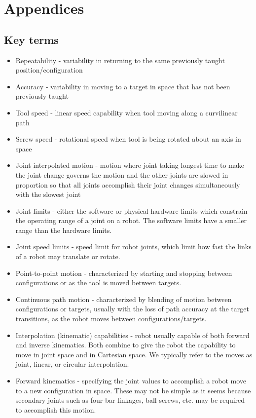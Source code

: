 \documentclass{book}
\begin{document}
\chapter{Appendices}

\section{Key terms}
	\begin{itemize}
		\item 	Repeatability - variability in returning to the same previously taught position/configuration
		\item Accuracy - variability in moving to a target in space that has not been previously taught
		\item Tool speed - linear speed capability when tool moving along a curvilinear path
		\item Screw speed - rotational speed when tool is being rotated about an axis in space
		\item Joint interpolated motion - motion where joint taking longest time to make the joint change governs the motion and the other joints are slowed in proportion so that all joints accomplish their joint changes simultaneously with the slowest joint
		\item Joint limits - either the software or physical hardware limits which constrain the operating range of a joint on a robot. The software limits have a smaller range than the hardware limits.
		\item Joint speed limits - speed limit for robot joints, which limit how fast the links of a robot may translate or rotate.
		\item Point-to-point motion - characterized by starting and stopping between configurations or as the tool is moved between targets.
		\item Continuous path motion - characterized by blending of motion between configurations or targets, usually with the loss of path accuracy at the target transitions, as the robot moves between configurations/targets.
		\item Interpolation (kinematic) capabilities - robot usually capable of both forward and inverse kinematics. Both combine to give the robot the capability to move in joint space and in  Cartesian space. We typically refer to the moves as joint, linear, or circular interpolation.
		\item Forward kinematics - specifying the joint values to accomplish a robot move to a new configuration in space. These may not be simple as it seems because secondary joints such as four-bar linkages, ball screws, etc. may be required to accomplish this motion.

\end{itemize}
\end{document}
